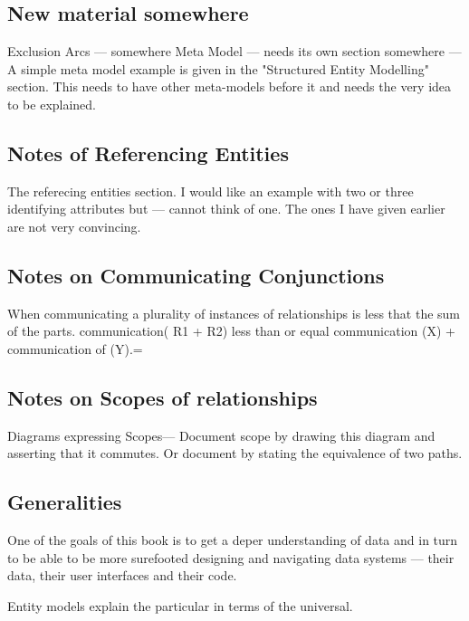 \subsection{New material somewhere}
\mynote Exclusion Arcs --- somewhere 
\mynote Meta Model --- needs its own section somewhere --- A simple meta model example is given in the "Structured Entity Modelling" section. This needs to have other meta-models before it and needs the very idea to be explained.

\subsection{Notes of Referencing Entities}
\begin{noteforfuture}
The referecing entities section. I would like an example with two or three identifying attributes but --- cannot think of one. The ones I have given earlier are not very convincing.
\end{noteforfuture}


\subsection{Notes on Communicating Conjunctions}
\begin{noteforfuture}
When communicating a plurality of instances of relationships is less that the sum of the parts.
communication( R1 + R2) less than or equal communication (X) + communication of (Y).=
\end{noteforfuture}


\subsection{Notes on Scopes of relationships}
\mynote
Diagrams expressing Scopes---
Document scope by drawing this diagram and asserting that it commutes. Or document by stating the equivalence of two paths. 

\subsection{Generalities}
\begin{noteforfuture}
One of the goals of this book is to get a deper understanding of data and in turn to be able to be more surefooted designing and navigating data systems --- their data, their user interfaces and their code.
\end{noteforfuture}

\begin{noteforfuture}
Entity models explain the particular in terms of the universal.
\end{noteforfuture}


